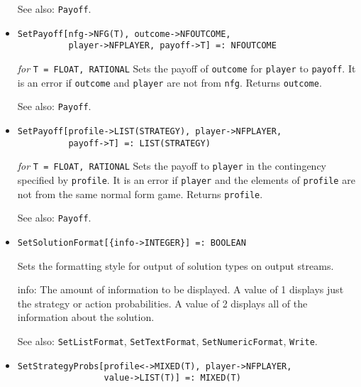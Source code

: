 \begin{itemize}
{\it for} {\tt T = FLOAT, RATIONAL}
\bd
Sets the payoff of \verb+outcome+ for \verb+player+ to \verb+payoff+.
It is an error if \verb+outcome+ and \verb+player+ are not from the
same extensive form game.  Returns \verb+outcome+.
\item [See also:] \verb+Payoff+.
\ed

\item{}
\protect \large \begin{verbatim}
SetPayoff[nfg->NFG(T), outcome->NFOUTCOME,
          player->NFPLAYER, payoff->T] =: NFOUTCOME
\end{verbatim}\normalsize

{\it for} {\tt T = FLOAT, RATIONAL}
\bd
Sets the payoff of \verb+outcome+ for \verb+player+ to \verb+payoff+.
It is an error if \verb+outcome+ and \verb+player+ are not from \verb+nfg+.
Returns \verb+outcome+.
\item [See also:] \verb+Payoff+.
\ed

\item{}
\protect \large \begin{verbatim}
SetPayoff[profile->LIST(STRATEGY), player->NFPLAYER,
          payoff->T] =: LIST(STRATEGY)
\end{verbatim}\normalsize

{\it for} {\tt T = FLOAT, RATIONAL}
\bd
Sets the payoff to \verb+player+ in the contingency specified by
\verb+profile+.  It is an error if \verb+player+ and the elements
of \verb+profile+ are not from the same normal form game.
Returns \verb+profile+.
\item [See also:] \verb+Payoff+.
\ed

\item{}
\protect \large \begin{verbatim}
SetSolutionFormat[{info->INTEGER}] =: BOOLEAN
\end{verbatim}\normalsize

\bd
Sets the formatting style for output of solution types on output streams.
\bd
\item [info:] The amount of information to be displayed.  A value of 1
displays just the strategy or action probabilities.  A value of 2
displays all of the information about the solution. 
\ed
\item [See also:] \verb+SetListFormat+, \verb+SetTextFormat+, 
\verb+SetNumericFormat+, \verb+Write+.
\ed

\item{} 
\protect \large \begin{verbatim}
SetStrategyProbs[profile<->MIXED(T), player->NFPLAYER,
                 value->LIST(T)] =: MIXED(T)
\end{verbatim} \normalsize


\end{itemize}

